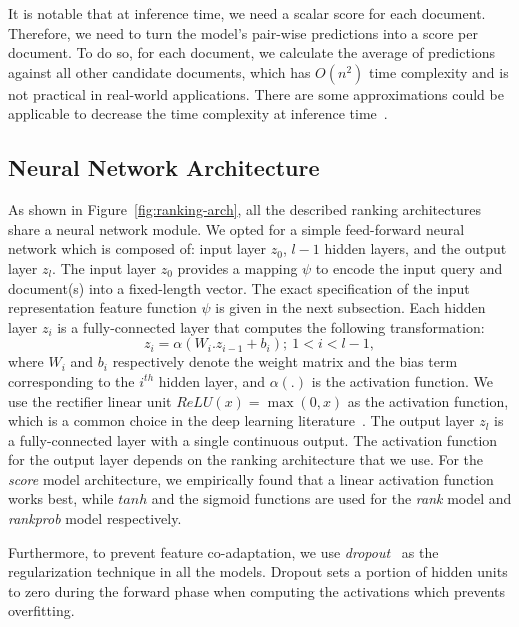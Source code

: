 \documentclass[sigconf]{acmart}
\newcommand{\modelone}{\textit{score} model\xspace}
\newcommand{\modeltwo}{\textit{rank} model\xspace}
\newcommand{\modelthree}{\textit{rank\-prob} model\xspace}
\newcommand{\sshrink}{\vspace{-.80ex}}
\begin{document}
It is notable that at inference time, we need a scalar score for each document. Therefore, we need to turn the model's pair-wise predictions into a score per document. To do so, for each document, we calculate the average of predictions against all other candidate documents, which has $O(n^2)$ time complexity and is not practical in real-world applications. There are some approximations could be applicable to decrease the time complexity at inference time~\citep{Wauthier:2013}.

\sshrink
\subsection{Neural Network Architecture}
As shown in Figure~\ref{fig:ranking-arch}, all the described ranking architectures share a neural network module. 
We opted for a simple feed-forward neural network which is composed of: input layer $z_0$, $l-1$ hidden layers, and the output layer $z_l$. The input layer $z_0$ provides a mapping $\psi$ to encode the input query and document(s) into a fixed-length vector.
The exact specification of the input representation feature function $\psi$ is given in the next subsection. 
Each hidden layer $z_i$ is a fully-connected layer that computes the following transformation:
\begin{equation}
    z_i = \alpha(W_i.z_{i-1} + b_i); ~ 1<i<l-1,
\end{equation}
where $W_i$ and $b_i$ respectively denote the weight matrix and the bias term corresponding to the $i^{th}$ hidden layer, and $\alpha(.)$ is the activation function. We use the rectifier linear unit $\textit{ReLU}(x) = \max(0, x)$ as the activation function, which is a common choice in the deep learning literature~\citep{Lecun:2015}. 
The output layer $z_l$ is a fully-connected layer with a single continuous output. The activation function for the output layer depends on the ranking architecture that we use. For the \modelone architecture, we empirically found that a linear activation function works best, while $tanh$ and the sigmoid functions are used for the \modeltwo and \modelthree respectively.

Furthermore, to prevent feature co-adaptation, we use \emph{dropout}~\citep{Srivastava:2014} as the regularization technique in all the models. Dropout sets a portion of hidden units to zero during the forward phase when computing the activations which prevents overfitting.



\sshrink
\end{document}
